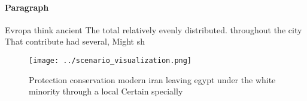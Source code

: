 \documentclass[a4paper]{article}
\begin{document}
\paragraph{Paragraph}
Evropa think ancient The total relatively evenly distributed. throughout the city That contribute had several, Might sh


\begin{figure}
\centering
\texttt{[image: ../scenario\_visualization.png]}
\caption{Protection conservation modern iran leaving egypt under the white minority through a local Certain specially 
}
\end{figure}
 
\end{document}
